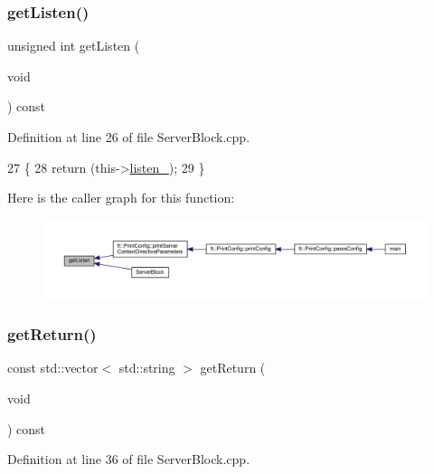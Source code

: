 \subsubsection{\texorpdfstring{get\+Listen()}{getListen()}}
{\footnotesize\ttfamily unsigned int get\+Listen (\begin{DoxyParamCaption}\item[{void}]{ }\end{DoxyParamCaption}) const}



Definition at line 26 of file Server\+Block.\+cpp.


\begin{DoxyCode}
27     \{
28         \textcolor{keywordflow}{return} (this->\hyperlink{classft_1_1_server_block_aa3d35e32d01734ff75f940faaee932f5}{listen\_});
29     \}
\end{DoxyCode}
Here is the caller graph for this function\+:
\nopagebreak
\begin{figure}[H]
\begin{center}
\leavevmode
\includegraphics[width=350pt]{classft_1_1_server_block_a2e03d2c2635620f103971ff8031779a7_icgraph}
\end{center}
\end{figure}
\mbox{\label{classft_1_1_server_block_aeef5e4710c02406c46e54d4aa0c8f57c}} 
\subsubsection{\texorpdfstring{get\+Return()}{getReturn()}}
{\footnotesize\ttfamily const std\+::vector$<$ std\+::string $>$ get\+Return (\begin{DoxyParamCaption}\item[{void}]{ }\end{DoxyParamCaption}) const}



Definition at line 36 of file Server\+Block.\+cpp.


